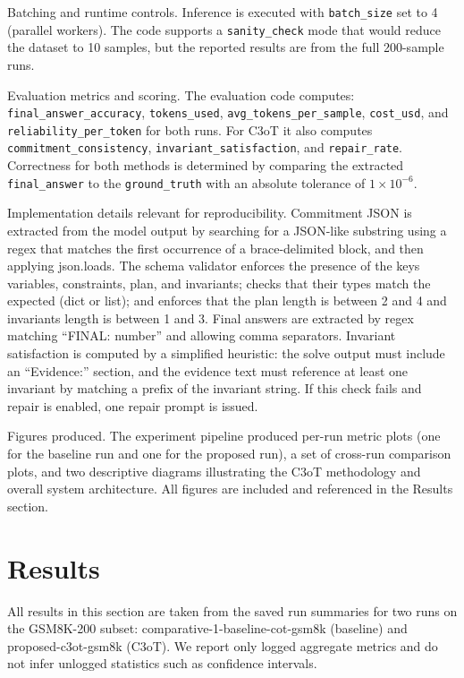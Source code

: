 \documentclass[journal,article,submit,pdftex,moreauthors]{Definitions/mdpi}
\begin{document}
Batching and runtime controls. Inference is executed with \texttt{batch\_size} set to 4 (parallel workers). The code supports a \texttt{sanity\_check} mode that would reduce the dataset to 10 samples, but the reported results are from the full 200-sample runs.

Evaluation metrics and scoring. The evaluation code computes: \texttt{final\_answer\_accuracy}, \texttt{tokens\_used}, \texttt{avg\_tokens\_per\_sample}, \texttt{cost\_usd}, and \texttt{reliability\_per\_token} for both runs. For C3oT it also computes \texttt{commitment\_consistency}, \texttt{invariant\_satisfaction}, and \texttt{repair\_rate}. Correctness for both methods is determined by comparing the extracted \texttt{final\_answer} to the \texttt{ground\_truth} with an absolute tolerance of $1 \times 10^{-6}$.

Implementation details relevant for reproducibility. Commitment JSON is extracted from the model output by searching for a JSON-like substring using a regex that matches the first occurrence of a brace-delimited block, and then applying json.loads. The schema validator enforces the presence of the keys variables, constraints, plan, and invariants; checks that their types match the expected (dict or list); and enforces that the plan length is between 2 and 4 and invariants length is between 1 and 3. Final answers are extracted by regex matching “FINAL: number” and allowing comma separators. Invariant satisfaction is computed by a simplified heuristic: the solve output must include an “Evidence:” section, and the evidence text must reference at least one invariant by matching a prefix of the invariant string. If this check fails and repair is enabled, one repair prompt is issued.

Figures produced. The experiment pipeline produced per-run metric plots (one for the baseline run and one for the proposed run), a set of cross-run comparison plots, and two descriptive diagrams illustrating the C3oT methodology and overall system architecture. All figures are included and referenced in the Results section.

\section{Results}

All results in this section are taken from the saved run summaries for two runs on the GSM8K-200 subset: comparative-1-baseline-cot-gsm8k (baseline) and proposed-c3ot-gsm8k (C3oT). We report only logged aggregate metrics and do not infer unlogged statistics such as confidence intervals.
\end{document}
